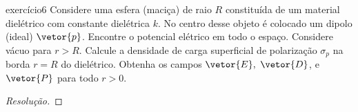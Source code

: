 \begin{exercício}{}{exercício6}
    Considere uma esfera (maciça) de raio \(R\) constituída de um material dielétrico com constante dielétrica \(k\). No centro desse objeto é colocado um dipolo (ideal) \(\vetor{p}\). Encontre o potencial elétrico em todo o espaço. Considere vácuo para \(r > R\). Calcule a densidade de carga superficial de polarização \(\sigma_p\) na borda \(r = R\) do dielétrico. Obtenha os campos \(\vetor{E},\) \(\vetor{D}\), e \(\vetor{P}\) para todo \(r > 0\).
\end{exercício}
\begin{proof}[Resolução]

\end{proof}

